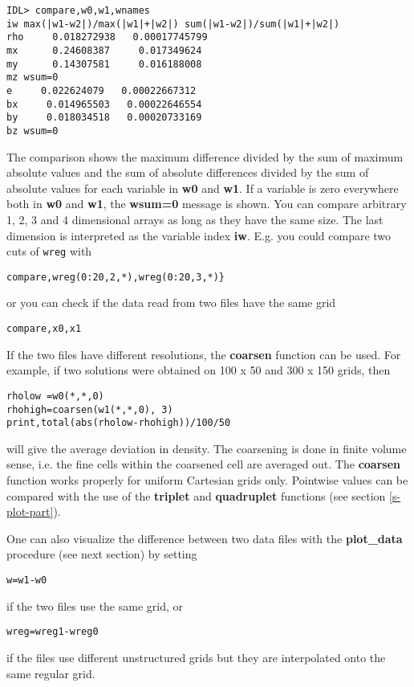 \documentclass{article}
\begin{document}
\begin{verbatim}
IDL> compare,w0,w1,wnames
iw max(|w1-w2|)/max(|w1|+|w2|) sum(|w1-w2|)/sum(|w1|+|w2|)
rho     0.018272938   0.00017745799
mx      0.24608387     0.017349624
my      0.14307581     0.016188008
mz wsum=0
e     0.022624079   0.00022667312
bx     0.014965503   0.00022646554
by     0.018034518   0.00020733169
bz wsum=0
\end{verbatim}
The comparison shows the maximum difference divided by the sum of maximum 
absolute
values and the sum of absolute differences divided by the sum of absolute
values for each variable in {\bf w0} and {\bf w1}. If a variable is zero
everywhere both in {\bf w0} and {\bf w1}, the {\bf wsum=0} message is shown.
You can compare arbitrary 1, 2, 3 and 4 dimensional arrays as long as they 
have the same size.
The last dimension is interpreted as the variable index {\bf iw}.
E.g. you could compare two cuts of {\tt wreg} with
\begin{verbatim}
compare,wreg(0:20,2,*),wreg(0:20,3,*)}
\end{verbatim}
   or you can check if the data read from two files have the same grid
\begin{verbatim}
compare,x0,x1
\end{verbatim}
If the two files have different resolutions, the {\bf coarsen} 
function can be used. For example, if two solutions were obtained on 
100 x 50 and 300 x 150 grids, then 
\begin{verbatim}
rholow =w0(*,*,0)
rhohigh=coarsen(w1(*,*,0), 3)
print,total(abs(rholow-rhohigh))/100/50
\end{verbatim}
will give the average deviation in density. The coarsening is done in
finite volume sense, i.e. the fine cells within the coarsened cell are
averaged out. The {\bf coarsen} function works properly for
uniform Cartesian grids only. Pointwise values can be compared
with the use of the {\bf triplet} and {\bf quadruplet} functions 
(see section \ref{s-plot-part}).

One can also visualize the difference between two data files 
with the {\bf plot\_data} procedure (see next section) by setting
\begin{verbatim}
w=w1-w0
\end{verbatim}
   if the two files use the same grid, or
\begin{verbatim}
wreg=wreg1-wreg0
\end{verbatim}
if the files use different unstructured grids but they are 
interpolated onto the same regular grid.
\end{document}
